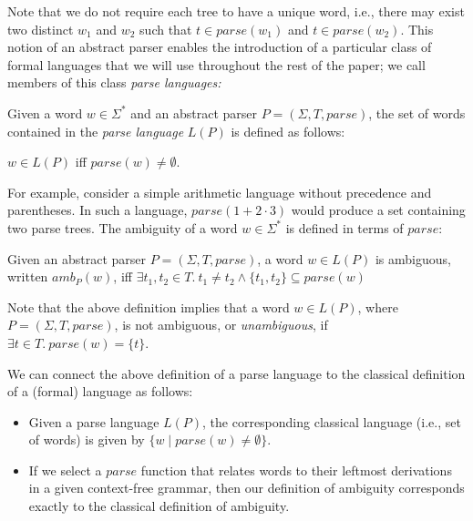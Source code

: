 \documentclass[runningheads]{llncs}
\newcommand{\T}{\Sigma} %
\newcommand{\parse}{\mathit{parse}} %
\newcommand{\amb}{\mathit{amb}}
\begin{document}
\noindent Note that we do not require each tree to have a unique word, i.e., there may exist two distinct $w_1$ and $w_2$ such that $t \in \parse(w_1)$ and $t \in \parse(w_2)$. This notion of an abstract parser enables the introduction of a particular class of formal languages that we will use throughout the rest of the paper; we call members of this class \emph{parse languages:}

\begin{definition}
  Given a word $w \in \T^{*}$ and an abstract parser $P = (\T, T,
  \parse)$, the set of words contained in the \emph{parse language}
  $L(P)$ is defined as follows:

  $w \in L(P)$ iff $\parse(w) \neq \emptyset$.
\end{definition}

\noindent For example, consider a simple arithmetic language without precedence and parentheses. In such a language, $\parse(1 + 2 \cdot 3)$ would produce a set containing two parse trees. %
%
%
The ambiguity of a word $w \in \T^{*}$ is defined in terms of $\parse$:

\begin{definition}
  Given an abstract parser $P = (\T, T, \parse)$, a word $w \in L(P)$
  is ambiguous, written $\amb_P(w)$, iff
%
  $\exists t_1, t_2 \in T.\ t_1 \neq t_2 \land \{t_1, t_2\} \subseteq \parse(w)$
\end{definition}

\noindent
Note that the above definition implies that a word $w \in L(P)$, where
$P = (\T, T, \parse)$, is not ambiguous, or \emph{unambiguous}, if
$\exists t \in T.\ \parse(w) = \{t\}$.

We can connect the above definition of a parse language to the
classical definition of a (formal) language as follows:

\begin{itemize}
\item Given a parse language $L(P)$, the corresponding classical language (i.e., set of words) is given by $\{ w \mid \parse(w) \neq \emptyset \}$.
\item If we select a $\parse$ function that relates words to their leftmost derivations in a given context-free grammar, then our definition of ambiguity corresponds exactly to the classical definition of ambiguity.
\end{itemize}
\end{document}
